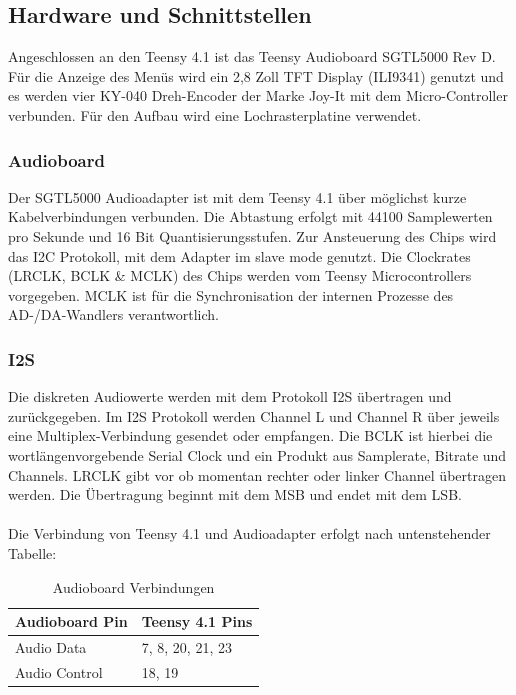 \documentclass[12pt]{article}
\begin{document}
\newpage

\subsection{Hardware und Schnittstellen}
Angeschlossen an den Teensy 4.1 ist das Teensy Audioboard SGTL5000 Rev D. 
Für die Anzeige des Menüs wird ein 2,8 Zoll TFT Display (ILI9341) 
genutzt und es werden vier KY-040 Dreh-Encoder der Marke Joy-It mit dem Micro-Controller verbunden. 
Für den Aufbau wird eine Lochrasterplatine verwendet. 

\subsubsection{Audioboard}
Der SGTL5000 Audioadapter ist mit dem Teensy 4.1 über möglichst kurze Kabelverbindungen verbunden. 
Die Abtastung erfolgt mit 44100 Samplewerten pro Sekunde und 16 Bit Quantisierungsstufen. 
Zur Ansteuerung des Chips wird das I2C Protokoll, mit dem Adapter im \glq slave mode\grq{}\: genutzt. 
Die Clockrates (LRCLK, BCLK \& MCLK) des Chips werden vom Teensy Microcontrollers vorgegeben. 
MCLK ist für die Synchronisation der internen Prozesse des AD-/DA-Wandlers verantwortlich.  
\subsubsection{I2S}
Die diskreten Audiowerte werden mit dem Protokoll I2S übertragen und zurückgegeben. 
Im I2S Protokoll werden Channel L und Channel R über jeweils eine Multiplex-Verbindung gesendet oder empfangen. 
Die BCLK ist hierbei die wortlängenvorgebende Serial Clock und ein Produkt aus Samplerate, Bitrate und Channels. 
LRCLK gibt vor ob momentan rechter oder linker Channel übertragen werden. 
Die Übertragung beginnt mit dem MSB und endet mit dem LSB.
\\
\\  
Die Verbindung von Teensy 4.1 und Audioadapter erfolgt nach untenstehender Tabelle:
\\

\begin{table}[h]
  \centering
  \caption{Audioboard Verbindungen}
  \label{tbl:audioboardverbindungen}
  \begin{tabular}{l|l}
    \textbf{Audioboard Pin}  & \textbf{Teensy 4.1 Pins}\\
    \hline
    Audio Data & 7, 8, 20, 21, 23\\
 
    Audio Control	 & 18, 19\\
 
   

  \end{tabular}    

\end{table}
\end{document}
